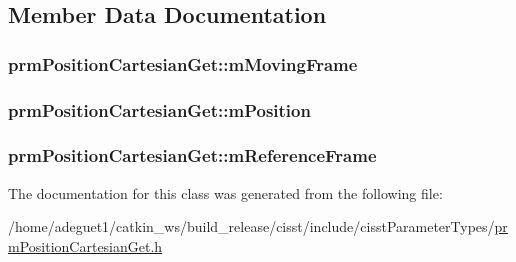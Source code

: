 \subsection{Member Data Documentation}
\hypertarget{classprm_position_cartesian_get_a01778edc80fb05f525a61afd47753631}{
\subsubsection[{m\-Moving\-Frame}]{ prm\-Position\-Cartesian\-Get\-::m\-Moving\-Frame\hspace{0.3cm}{\ttfamily [protected]}}}\label{classprm_position_cartesian_get_a01778edc80fb05f525a61afd47753631}
\hypertarget{classprm_position_cartesian_get_ac1033fd1dd058ef3976c5161a483fa92}{
\subsubsection[{m\-Position}]{ prm\-Position\-Cartesian\-Get\-::m\-Position\hspace{0.3cm}{\ttfamily [protected]}}}\label{classprm_position_cartesian_get_ac1033fd1dd058ef3976c5161a483fa92}
\hypertarget{classprm_position_cartesian_get_a64e672cde3d04a727f394fc97dc455ed}{
\subsubsection[{m\-Reference\-Frame}]{ prm\-Position\-Cartesian\-Get\-::m\-Reference\-Frame\hspace{0.3cm}{\ttfamily [protected]}}}\label{classprm_position_cartesian_get_a64e672cde3d04a727f394fc97dc455ed}


The documentation for this class was generated from the following file\-:\begin{DoxyCompactItemize}
\item 
/home/adeguet1/catkin\-\_\-ws/build\-\_\-release/cisst/include/cisst\-Parameter\-Types/\hyperlink{prm_position_cartesian_get_8h}{prm\-Position\-Cartesian\-Get.\-h}\end{DoxyCompactItemize}
